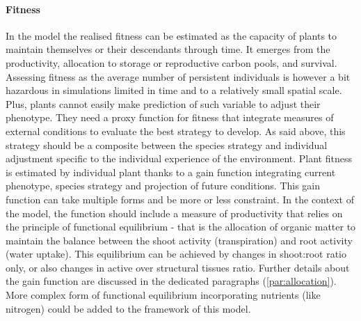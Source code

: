 \documentclass[a4paper,twoside, justified,marginals=raggedright, nobib]{tufte-handout}
\begin{document}
\paragraph{Fitness} 
In the model the realised fitness can be estimated as the capacity of plants to maintain themselves or their descendants through time. It emerges from the productivity, allocation to storage or reproductive carbon pools, and survival. Assessing fitness as the average number of persistent individuals is however a bit hazardous in simulations limited in time and to a relatively small spatial scale. Plus, plants cannot easily make prediction of such variable to adjust their phenotype. They need a proxy function for fitness that integrate measures of external conditions to evaluate the best strategy to develop. As said above, this strategy should be a composite between the species strategy and individual adjustment specific to the individual experience of the environment. Plant fitness is estimated by individual plant thanks to a gain function integrating current phenotype, species strategy and projection of future conditions. This gain function can take multiple forms and be more or less constraint. In the context of the model, the function should include a measure of productivity that relies on the principle of functional equilibrium - that is the allocation of organic matter to maintain the balance between the shoot activity (transpiration) and root activity (water uptake). This equilibrium can be achieved by changes in shoot:root ratio only, or also changes in active over structural tissues ratio. Further details about the gain function are discussed in the dedicated paragraphs (\ref{par:allocation}). More complex form of functional equilibrium incorporating nutrients (like nitrogen) could be added to the framework of this model.
\end{document}
